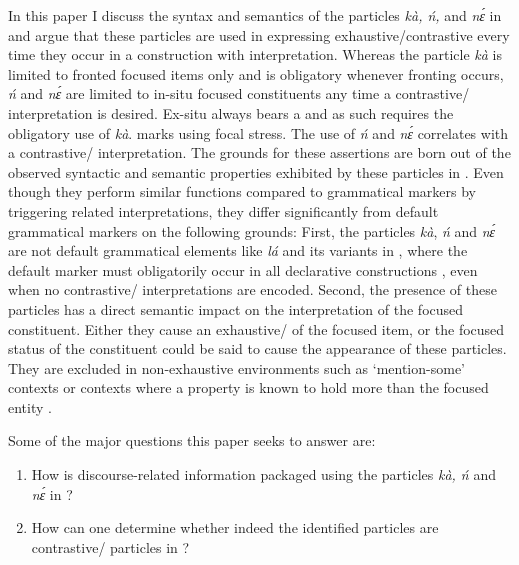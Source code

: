 \documentclass[output=paper,modfonts,nonflat,
 hidelinks
]{langsci/langscibook}
\begin{document}
In this paper I discuss the syntax and semantics of the particles \textit{kà, ń,} and \textit{nɛ́} in  and argue that these particles are used in expressing exhaustive{\slash}contrastive  every time they occur in a construction with  interpretation. Whereas the particle \textit{kà} is limited to fronted focused items only and is obligatory whenever fronting occurs, \textit{ń} and \textit{nɛ́} are limited to in-situ focused constituents any time a contrastive{\slash} interpretation is desired. Ex-situ  always bears a  and as such requires the obligatory use of \textit{kà}.  marks  using focal stress. The use of \textit{ń} and \textit{nɛ́} correlates with a contrastive{\slash} interpretation. The grounds for these assertions are born out of the observed syntactic and semantic properties exhibited by these particles in . Even though they perform similar functions compared to grammatical  markers by triggering  related interpretations, they differ significantly from default grammatical  markers on the following grounds: First, the particles \textit{kà}, \textit{ń} and \textit{nɛ́} are not default grammatical  elements like \textit{lá} and its variants in , where the default  marker must obligatorily occur in all declarative constructions \citep{Bodomo1997}, even when no contrastive{\slash} interpretations are encoded. Second, the presence of these particles has a direct semantic impact on the interpretation of the focused constituent. Either they cause an exhaustive/ of the focused item, or the focused status of the constituent could be said to cause the appearance of these particles. They are excluded in non-exhaustive environments such as ‘mention-some’ contexts or contexts where a property is known to hold more than the focused entity \citep[242]{hartmann2007}. 

Some of the major questions this paper seeks to answer are:
\begin{enumerate}
\item How is discourse-related information packaged using the particles \textit{kà, ń} and \textit{nɛ́} in ? 
\item How can one determine whether indeed the identified particles are contrastive{\slash} particles in ? 
\end{enumerate}
\end{document}
